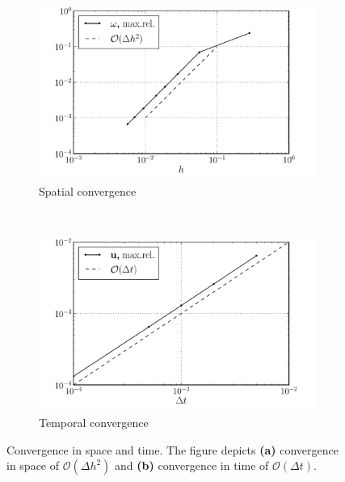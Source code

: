 	\begin{figure}[p]
        \centering
        \begin{subfigure}[b]{0.5\textwidth}
                \includegraphics[width=\textwidth]{figures/eulerian/lambOseen_eulerianConvergence_dx_compressed.pdf}
                \caption{Spatial convergence}
                \label{fig:lambOseen_eulerianConvergence_dx}
        \end{subfigure}%
        ~ %
        \begin{subfigure}[b]{0.5\textwidth}
                \includegraphics[width=\textwidth]{figures/eulerian/lambOseen_eulerianConvergence_dt_compressed.pdf}
                \caption{Temporal convergence}
                \label{fig:lambOseen_eulerianConvergence_dt}
        \end{subfigure}
        \caption{Convergence in space and time. The figure depicts \textbf{(a)} convergence in space of $\mathcal{O}(\Delta h^2)$ and \textbf{(b)} convergence in time of $\mathcal{O}(\Delta t)$.}
        \label{fig:lambOseen_eulerianConvergence}
	\end{figure}		
	


